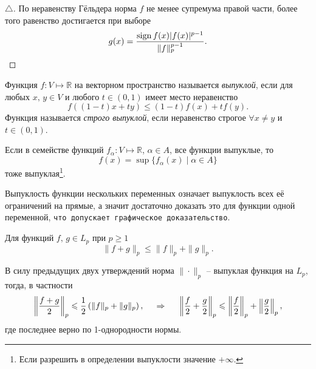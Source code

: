 \begin{proof}[$\triangle$]
По неравенству Гёльдера норма $f$ не менее супремума правой части, более того равенство достигается при выборе
\begin{equation*}
    g(x) = \frac{\sign f(x) |f(x)|^{p-1}}{\|f\|_p^{p-1}}.
\end{equation*}
\end{proof}

\begin{to_def}
    Функция $f \colon V \mapsto \mathbb{R}$ на векторном пространство называется \textit{выпуклой}, если для любых $x, \, y \in V$ и любого $t \in (0, 1)$ имеет место неравенство
    \begin{equation*}
        f ( (1-t) x + ty) \leq (1-t) f(x) + t f(y).
    \end{equation*}
    Функция называется \textit{строго выпуклой}, если неравенство строгое $\forall x \neq y$ и $t \in (0, 1)$. 
\end{to_def}

\begin{to_lem}
    Если в семействе функций $f_\alpha \colon V \mapsto \mathbb{R}$, $\alpha \in A$, все функции выпуклые, то
    \begin{equation*}
        f(x) = \sup \{f_\alpha (x) \mid \alpha \in A\}
    \end{equation*}
    тоже выпуклая\footnote{
        Если разрешить в определении выпуклости значение $+ \infty$.
    }.
\end{to_lem}

\begin{uproof}
    Выпуклость функции нескольких переменных означает выпуклость всех её ограничений на прямые, а значит достаточно доказать это для функции одной переменной, \texttt{что допускает графическое доказательство}. 
\end{uproof}

\begin{to_thr}
    Для функций $f, \, g \in L_p$ при $p \geq 1$
    \begin{equation*}
        \|f + g\|_p \leq \|f\|_p + \|g\|_p.
    \end{equation*}
\end{to_thr}

\begin{uproof}
    В силу предыдущих двух утверждений норма $\|\cdot\|_p$ -- выпуклая функция на $L_p$, тогда, в частности
    \begin{equation*}
        \left\|\frac{f+g}{2}\right\|_p \leq \frac{1}{2} \left(
            \|f\|_p + \|g\|_p
        \right),
        \hspace{0.5cm} \Rightarrow \hspace{0.5cm}  
        \left\|\frac{f}{2} + \frac{g}{2}\right\|_p \leq \left\|\frac{f}{2}\right\|_p + \left\|\frac{g}{2}\right\|_p,
    \end{equation*}
    где последнее верно по 1-однородности нормы. 
\end{uproof}

